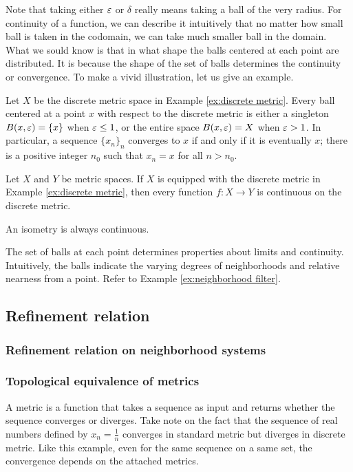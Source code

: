 Note that taking either $\varepsilon$ or $\delta$ really means taking a ball of the very radius.
For continuity of a function, we can describe it intuitively that no matter how small ball is taken in the codomain, we can take much smaller ball in the domain.
What we sould know is that in what shape the balls centered at each point are distributed.
It is because the shape of the set of balls determines the continuity or convergence.
To make a vivid illustration, let us give an example.

\begin{ex}
Let $X$ be the discrete metric space in Example \ref{ex:discrete metric}.
Every ball centered at a point $x$ with respect to the discrete metric is either a singleton $B(x,\varepsilon)=\{x\}$ when $\varepsilon\le1$, or the entire space $B(x,\varepsilon)=X$ when $\varepsilon>1$.
In particular, a sequence $\{x_n\}_n$ converges to $x$ if and only if it is eventually $x$; there is a positive integer $n_0$ such that $x_n=x$ for all $n>n_0$.
\end{ex}
\begin{ex}
Let $X$ and $Y$ be metric spaces.
If $X$ is equipped with the discrete metric in Example \ref{ex:discrete metric}, then every function $f:X\to Y$ is continuous on the discrete metric.
\end{ex}
\begin{ex}
An isometry is always continuous.
\end{ex}

The set of balls at each point determines properties about limits and continuity.
Intuitively, the balls indicate the varying degrees of neighborhoods and relative nearness from a point.
Refer to Example \ref{ex:neighborhood filter}.



\subsection{Refinement relation}

\subsubsection{Refinement relation on neighborhood systems}


\subsubsection{Topological equivalence of metrics}

A metric is a function that takes a sequence as input and returns whether the sequence converges or diverges.
Take note on the fact that the sequence of real numbers defined by $x_n=\frac1n$ converges in standard metric but diverges in discrete metric.
Like this example, even for the same sequence on a same set, the convergence depends on the attached metrics.

